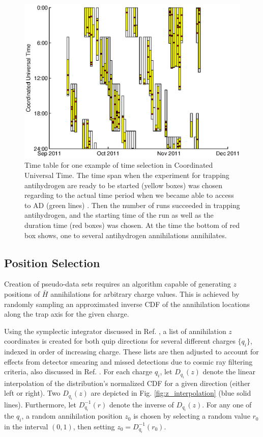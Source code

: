 \documentclass[superscriptaddress,aps,prb,11pt]{revtex4-1}
\begin{document}
\begin{figure}
  \includegraphics[scale=0.6]{eventTime_sim_example.eps}
  \caption{Time table for one example of time selection in Coordinated Universal Time. The time span when the experiment for trapping antihydrogen are ready to be started (yellow boxes) was chosen regarding to the actual time period when we became able to access to AD (green lines) . Then the number of runs succeeded in trapping antihydrogen, and the starting time  of the run as well as the duration time (red boxes) was chosen. At the time the bottom of red box shows, one to several antihydrogen annihilations annihilates.}
  \label{fig:eventTime_date_sim}
\end{figure}



\subsection*{Position Selection}
Creation of pseudo-data sets requires an algorithm capable of generating $z$ positions of $\bar{H}$ annihilations for arbitrary charge values.  This is achieved by randomly sampling an approximated inverse CDF of the annihilation locations along the trap axis for the given charge.

Using the symplectic integrator discussed in Ref. , a list of annihilation $z$ coordinates is created for both quip directions for several different charges $\{q_i\}$, indexed in order of increasing charge.  These lists are then adjusted to account for effects from detector smearing and missed detections due to cosmic ray filtering criteria, also discussed in Ref. .  For each charge $q_i$, let $D_{q_i}(z)$ denote the linear interpolation of the distribution's normalized CDF for a given direction (either left or right).  Two $D_{q_i}(z)$ are depicted in Fig. \ref{fig:z_interpolation} (blue solid lines).  Furthermore, let $D^{-1}_{q_i}(r)$ denote the inverse of $D_{q_i}(z)$.  For any one of the $q_i$, a random annihilation position $z_0$ is chosen by selecting a random value $r_0$ in the interval $(0,1)$, then setting $z_0=D^{-1}_{q_i}(r_0)$.
\end{document}
